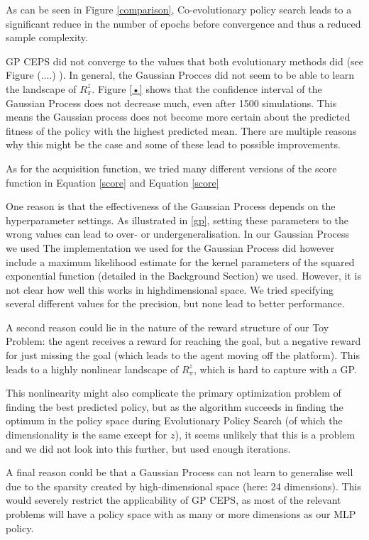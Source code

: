 As can be seen in Figure \ref{comparison}, Co-evolutionary policy search leads to a significant reduce in the number of epochs before convergence and thus a reduced sample complexity. 

GP CEPS did not converge to the values that both evolutionary methods did (see Figure (....) ). In general, the Gaussian Procces did not seem to be able to learn the landscape of $R_{\pi}^z$. Figure \ref{•} shows that the confidence interval of the Gaussian Process does not decrease much, even after 1500 simulations. This means the Gaussian process does not become more certain about the predicted fitness of the policy with the highest predicted mean.
There are multiple reasons why this might be the case and some of these lead to possible improvements. 

As for the acquisition function, we tried many different versions of the score function in Equation \ref{score} and Equation \ref{score} 

One reason is that the effectiveness of the Gaussian Process depends on the hyperparameter settings. As illustrated in \ref{gp}, setting these parameters to the wrong values can lead to over- or undergeneralisation. In our Gaussian Process we used  The implementation we used for the Gaussian Process did however include a maximum likelihood estimate for the kernel parameters of the squared exponential function (detailed in the Background Section) we used. However, it is not clear how well this works in highdimensional space. We tried specifying several different values for the precision, but none lead to better performance. 

A second reason could lie in the nature of the reward   structure of our Toy Problem: the agent receives a reward for reaching the goal, but a negative reward for just missing the goal (which leads to the agent moving off the platform). This leads to a highly nonlinear landscape of $R_{\pi}^z$, which is hard to capture with a GP. 

This nonlinearity might also complicate the primary optimization problem of finding the best predicted policy, but as the algorithm succeeds in finding the optimum in the policy space during Evolutionary Policy Search (of which the dimensionality is the same except for $z$), it seems unlikely that this is a problem and we did not look into this further, but used enough iterations.

A final reason could be that a Gaussian Process can not learn to generalise well due to the sparsity created by high-dimensional space (here: 24 dimensions). This would severely restrict the applicability of GP CEPS, as most of the relevant problems will have a policy space with as many or more dimensions as our MLP policy.

